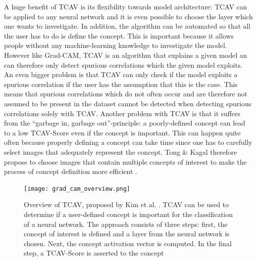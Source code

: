 \documentclass{article}
\begin{document}
A huge benefit of TCAV is its flexibility towards model architecture: TCAV can be applied to any neural network and it is even possible to choose the layer which one wants to investigate. In addition, the algorithm can be automated so that all the user has to do is define the concept. This is important because it allows people without any machine-learning knowledge to investigate the model. However like Grad-CAM, TCAV is an algorithm that explains a given model an can therefore only detect spurious correlations which the given model exploits. An even bigger problem is that TCAV can only check if the model exploits a spurious correlation if the user has the assumption that this is the case. This means that spurious correlations which do not often occur and are therefore not assumed to be present in the dataset cannot be detected when detecting spurious correlations solely with TCAV. Another problem with TCAV is that it suffers from the \enquote{garbage in, garbage out}-principle: a poorly-defined concept can lead to a low TCAV-Score even if the concept is important. This can happen quite often because properly defining a concept can take time since one has to carefully select images that adequately represent the concept. Tong \& Kagal therefore propose to choose images that contain multiple concepts of interest to make the process of concept definition more efficient \cite{tong2020investigating}.

\begin{figure}
    \centering
    \texttt{[image: grad\_cam\_overview.png]}
    \caption{Overview of TCAV, proposed by Kim et al. \cite{pmlr-v80-kim18d}. TCAV can be used to determine if a user-defined concept is important for the classification of a neural network. The approach consists of three steps: first, the concept of interest is defined and a layer from the neural network is chosen. Next, the concept activation vector is computed. In the final step, a TCAV-Score is asserted to the concept}
    \label{fig:tcav}
\end{figure}
\end{document}
